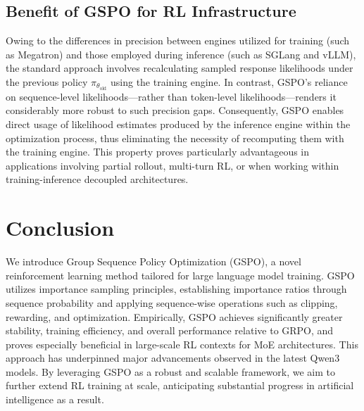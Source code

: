 \subsection{Benefit of GSPO for RL Infrastructure}

Owing to the differences in precision between engines utilized for training (such as Megatron) and those employed during inference (such as SGLang and vLLM), the standard approach involves recalculating sampled response likelihoods under the previous policy $\pi_{\theta_\text{old}}$ using the training engine. In contrast, GSPO's reliance on sequence-level likelihoods—rather than token-level likelihoods—renders it considerably more robust to such precision gaps. Consequently, GSPO enables direct usage of likelihood estimates produced by the inference engine within the optimization process, thus eliminating the necessity of recomputing them with the training engine. This property proves particularly advantageous in applications involving partial rollout, multi-turn RL, or when working within training-inference decoupled architectures.

\section{Conclusion}

We introduce Group Sequence Policy Optimization (GSPO), a novel reinforcement learning method tailored for large language model training. GSPO utilizes importance sampling principles, establishing importance ratios through sequence probability and applying sequence-wise operations such as clipping, rewarding, and optimization. Empirically, GSPO achieves significantly greater stability, training efficiency, and overall performance relative to GRPO, and proves especially beneficial in large-scale RL contexts for MoE architectures. This approach has underpinned major advancements observed in the latest Qwen3 models. By leveraging GSPO as a robust and scalable framework, we aim to further extend RL training at scale, anticipating substantial progress in artificial intelligence as a result.

